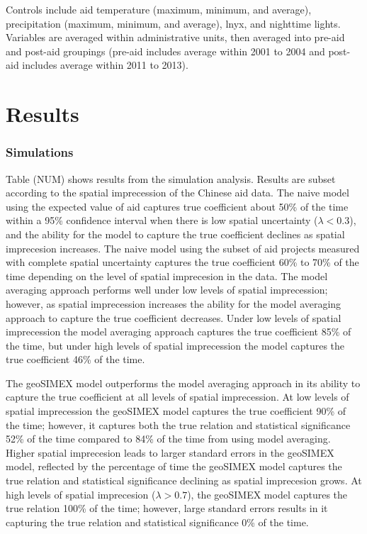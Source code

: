 Controls include aid temperature (maximum, minimum, and average), precipitation (maximum, minimum, and average), lnyx, and nighttime lights. Variables are averaged within administrative units, then averaged into pre-aid and post-aid groupings (pre-aid includes average within 2001 to 2004 and post-aid includes average within 2011 to 2013). 

\newpage

\section{Results}
\subsubsection{Simulations}

Table (NUM) shows results from the simulation analysis. Results are subset according to the spatial imprecession of the Chinese aid data. The naive model using the expected value of aid captures true coefficient about 50\% of the time within a 95\% confidence interval when there is low spatial uncertainty ($\lambda < 0.3$), and the ability for the model to capture the true coefficient declines as spatial imprecesion increases. The naive model using the subset of aid projects measured with complete spatial uncertainty captures the true coefficient 60\% to 70\% of the time depending on the level of spatial imprecesion in the data. The model averaging approach performs well under low levels of spatial imprecession; however, as spatial imprecession increases the ability for the model averaging approach to capture the true coefficient decreases. Under low levels of spatial imprecession the model averaging approach captures the true coefficient 85\% of the time, but under high levels of spatial imprecession the model captures the true coefficient 46\% of the time. 
\par
The geoSIMEX model outperforms the model averaging approach in its ability to capture the true coefficient at all levels of spatial imprecession. At low levels of spatial imprecession the geoSIMEX model captures the true coefficient 90\% of the time; however, it captures both the true relation and statistical significance 52\% of the time compared to 84\% of the time from using model averaging. Higher spatial imprecesion leads to larger standard errors in the geoSIMEX model, reflected by the percentage of time the geoSIMEX model captures the true relation and statistical significance declining as spatial imprecesion grows. At high levels of spatial imprecesion ($\lambda > 0.7$), the geoSIMEX model captures the true relation 100\% of the time; however, large standard errors results in it capturing the true relation and statistical significance 0\% of the time.   

